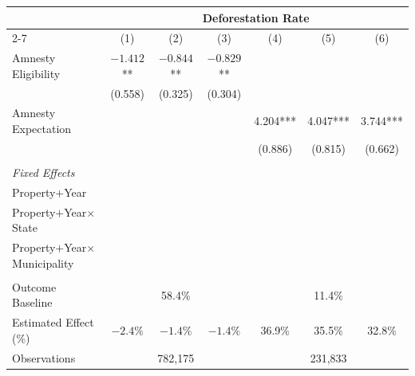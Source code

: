\documentclass[12pt]{article}
\begin{document}
 \begin{center}
 \begin{threeparttable}[b]
 \singlespacing
 \footnotesize
    	\caption{\textsc{2009 Amnesty Eligibility and Expectation Effects}}
\setlength{\tabcolsep}{3pt}
\begin{tabular}{l*{6}c}  \midrule \midrule
& \multicolumn{6}{c}{\textbf{Deforestation Rate}}   %
\\  \cmidrule(r){2-7} 
  & (1) & (2) & (3) & (4) & (5) & (6)  \\
   \midrule
  Amnesty Eligibility & $-1.412$** & $-0.844$** & $-0.829$** %
  \\
& (0.558) & (0.325) & (0.304) %
\\
Amnesty Expectation &   &   &   & 4.204*** & 4.047*** & 3.744*** \\  
&   &   &   & (0.886) & (0.815) & (0.662)
\\
\\ \midrule
\textit{Fixed Effects} \\
\quad Property$+$Year & \cellcolor{green!50} & & & \cellcolor{green!50}\\
\quad Property$+$Year$\times$State & & \cellcolor{green!50} && & \cellcolor{green!50} \\
\quad Property$+$Year$\times$Municipality && & \cellcolor{green!50} && & \cellcolor{green!50} \\
& \\
Outcome Baseline & \multicolumn{3}{c}{58.4\%} & \multicolumn{3}{c}{11.4\%} \\ 
Estimated Effect (\%) & $-2.4\%$ &	$-1.4\%$ &	$-1.4\%$ & 36.9\%	&35.5\% &	32.8\%   \\ 
Observations & \multicolumn{3}{c}{782,175} & \multicolumn{3}{c}{231,833} \\

\end{tabular}
\end{threeparttable}
\end{center}
\end{document}
